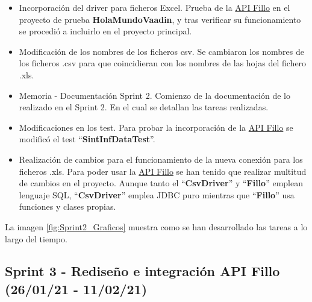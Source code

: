 \begin{itemize}
	\item Incorporación del driver para ficheros Excel. 
		Prueba de la \href{https://codoid.com/fillo/}{API Fillo} en el proyecto de prueba \textbf{HolaMundoVaadin}, y tras verificar su funcionamiento se procedió a incluirlo en el proyecto principal.
	\item Modificación de los nombres de los ficheros csv. 
		Se cambiaron los nombres de los ficheros .csv para que coincidieran con los nombres de las hojas del fichero .xls. 
	\item Memoria - Documentación Sprint 2. 
		Comienzo de la documentación de lo realizado en el Sprint 2. En el cual se detallan las tareas realizadas.
	\item Modificaciones en los test. 
		Para probar la incorporación de la \href{https://codoid.com/fillo/}{API Fillo} se modificó el test  ``\textbf{\textbf{SintInfDataTest}}''.
	\item Realización de cambios para el funcionamiento de la nueva conexión para los ficheros .xls. 
		Para poder usar la \href{https://codoid.com/fillo/}{API Fillo} se han tenido que realizar multitud de cambios en el proyecto. Aunque tanto el ``\textbf{\textbf{CsvDriver}}'' y ``\textbf{\textbf{Fillo}}'' emplean lenguaje SQL, ``\textbf{CsvDriver}'' emplea JDBC puro mientras que ``\textbf{Fillo}'' usa funciones y clases propias.
\end{itemize}

La imagen \ref{fig:Sprint2_Graficos} muestra como se han desarrollado las tareas a lo largo del tiempo.


\subsection{Sprint 3 - Rediseño e integración API Fillo (26/01/21 - 11/02/21)}

